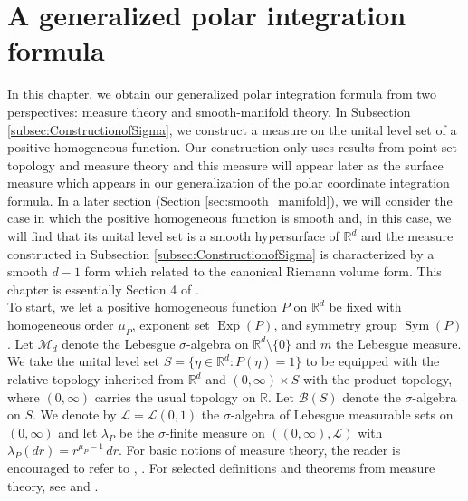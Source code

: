 \documentclass[11pt, letter]{book}
\newcommand\Sym{\operatorname{Sym}}
\newcommand\Exp{\operatorname{Exp}}
\begin{document}
\chapter{A generalized polar integration formula}\label{chap:formula}

In this chapter, we obtain our generalized polar integration formula from two perspectives: measure theory and smooth-manifold theory. In Subsection \ref{subsec:ConstructionofSigma}, we construct a measure on the unital level set of a positive homogeneous function. Our construction only uses results from point-set topology and measure theory and this measure will appear later as the surface measure which appears in our generalization of the polar coordinate integration formula. In a later section (Section \ref{sec:smooth_manifold}), we will consider the case in which the positive homogeneous function is smooth and, in this case, we will find that its unital level set is a smooth hypersurface of $\mathbb{R}^d$ and the measure constructed in Subsection \ref{subsec:ConstructionofSigma} is characterized by a smooth $d-1$ form which related to the canonical Riemann volume form. This chapter is essentially Section 4 of \cite{bui2021generalized}.\\

\noindent To start, we let a positive homogeneous function $P$ on $\mathbb{R}^d$ be fixed with homogeneous order $\mu_P$, exponent set $\Exp(P)$, and symmetry group $\Sym{(P)}$. Let $\mathcal{M}_d$ denote the Lebesgue $\sigma$-algebra on $\mathbb{R}^d\setminus\{ 0 \}$ and $m$ the Lebesgue measure. We take the unital level set $S = \{ \eta\in \mathbb{R}^d : P(\eta) = 1 \}$ to be equipped with the relative topology inherited from $\mathbb{R}^d$ and $(0,\infty)\times S$ with the product topology, where $(0,\infty)$ carries the usual topology on $\mathbb{R}$. Let $\mathcal{B}(S)$ denote the $\sigma$-algebra on $S$. We denote by $\mathcal{L}=\mathcal{L}(0,1)$ the $\sigma$-algebra of Lebesgue measurable sets on $(0,\infty)$ and let $\lambda_P$ be the $\sigma$-finite measure on $((0,\infty),\mathcal{L})$ with $\lambda_P(dr)=r^{\mu_P-1}\,dr$. For basic notions of measure theory, the reader is encouraged to refer to \cite{bogachev_measure_2007}, \cite{stein_real_2009}. For selected definitions and theorems from measure theory, see \cite{folland_real_2013} and \cite{stein_real_2009}.

\end{document}
